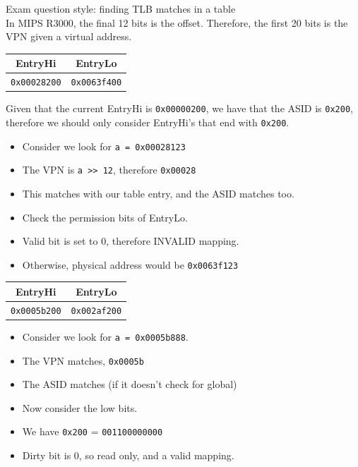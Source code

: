 \documentclass[journal, letterpaper]{IEEEtran}
\begin{document}
\begin{example}{Exam question style: finding TLB matches in a table} \\
    In MIPS R3000, the final 12 bits is the offset. Therefore, the first 20 bits is the VPN given a virtual address.
    \begin{center}
    \begin{tabular}{|c|c|}
    \hline
    \textbf{EntryHi} & \textbf{EntryLo} \\
    \hline
    \verb|0x00028200| & \verb|0x0063f400| \\
    \hline
    \end{tabular}
    \end{center}
    Given that the current EntryHi is \verb|0x00000200|, we have that the ASID is \verb|0x200|, therefore we should only consider EntryHi's that end with \verb|0x200|.
    \begin{itemize}
        \item Consider we look for \verb|a = 0x00028123|
        \item The VPN is \verb|a >> 12|, therefore \verb|0x00028|
        \item This matches with our table entry, and the ASID matches too.
        \item Check the permission bits of EntryLo.
        \item Valid bit is set to 0, therefore INVALID mapping.
        \item Otherwise, physical address would be \verb|0x0063f123|
    \end{itemize}
    \vspace{0.5cm}
    \begin{center}
    \begin{tabular}{|c|c|}
    \hline
    \textbf{EntryHi} & \textbf{EntryLo} \\
    \hline
    \verb|0x0005b200| & \verb|0x002af200| \\
    \hline
    \end{tabular}
    \end{center}
    \begin{itemize}
        \item Consider we look for \verb|a = 0x0005b888|.
        \item The VPN matches, \verb|0x0005b|
        \item The ASID matches (if it doesn't check for global)
        \item Now consider the low bits.
        \item We have \verb|0x200| = \verb|001100000000|
        \item Dirty bit is 0, so read only, and a valid mapping.
    \end{itemize}
\end{example}
\end{document}
